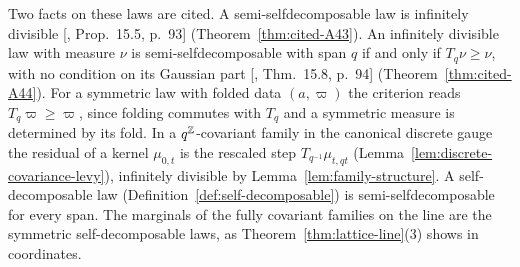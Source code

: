 Two facts on these laws are cited. A semi-selfdecomposable law is infinitely divisible
[, Prop.~15.5, p.~93] (Theorem~\ref{thm:cited-A43}). An infinitely divisible
law with \Levy{} measure $\nu$ is semi-selfdecomposable with span $q$ if and only if
$T_q\nu \ge \nu$, with no condition on its Gaussian part [, Thm.~15.8, p.~94]
(Theorem~\ref{thm:cited-A44}). For a symmetric law with folded data $(a, \varpi)$ the criterion
reads $T_q\varpi \ge \varpi$, since folding commutes with $T_q$ and a symmetric measure is
determined by its fold. In a
$q^{\mathbb{Z}}$-covariant family in the canonical discrete gauge the residual of a kernel
$\mu_{0,t}$ is the rescaled step $T_{q^{-1}}\mu_{t,qt}$
(Lemma~\ref{lem:discrete-covariance-levy}), infinitely divisible by
Lemma~\ref{lem:family-structure}. A self-decomposable law (Definition~\ref{def:self-decomposable})
is semi-selfdecomposable for every span. The marginals of the fully covariant families on the line
are the symmetric self-decomposable laws, as Theorem~\ref{thm:lattice-line}(3) shows in
coordinates.

